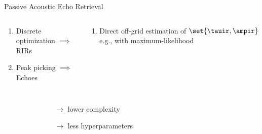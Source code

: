 \begin{frame}[t]{\alert{Passive} Acoustic Echo Retrieval \hfill\faBook}
        \vspace{.5em}
        \begin{columns}[T,onlytextwidth] %
            \begin{column}{.48\textwidth}
                \small
                \begin{enumerate}
                    \item Discrete optimization $\implies$ RIRs
                    \item Peak picking $\implies$ Echoes
                \end{enumerate}
            \end{column}
            \begin{column}{.48\textwidth}
                \small
                \begin{enumerate}
                    \item Direct off-grid estimation of $\set{\tauir, \ampir}$
                    e.g., with maximum-likelihood
                \end{enumerate}
            \end{column}%
        \end{columns}

        \vspace{1em}
        \begin{columns}[T,onlytextwidth] %
                \small
                \begin{itemize}
                    \item[\cmark] 
                    \item[\cmark] 
                    \\{\scriptsize~\cite{crocco2016estimation}}
                \end{itemize}
                \small
                \begin{itemize}
                    \item[\cmark] 
                    \begin{itemize}
                        \item[$\to$] lower complexity
                        \item[$\to$] less hyperparameters
                    \end{itemize}
                    \item[\cmark] 
                    \end{itemize}
        \end{columns}


\end{frame}

